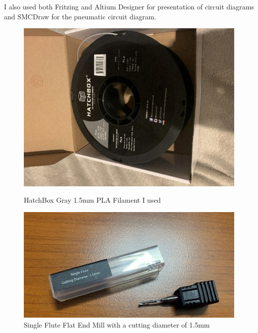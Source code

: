 \documentclass[twoside]{article}
\begin{document}
I also used both Fritzing and Altium Designer for presentation of circuit diagrams and SMCDraw for the pneumatic circuit diagram.

\begin{figure}[H]
	\centering
	
	\begin{minipage}[b]{0.4\linewidth}
		\centering
		\includegraphics[width=\textwidth]{pla}
		\caption{HatchBox Gray 1.5mm PLA Filament I used}
	\end{minipage}
	\hfill	
	\begin{minipage}[b]{0.4\linewidth}
		\centering
		\includegraphics[width=\textwidth]{mill_bit}
		\caption{Single Flute Flat End Mill with a cutting diameter of 1.5mm}
	\end{minipage}
\end{figure}
\end{document}
